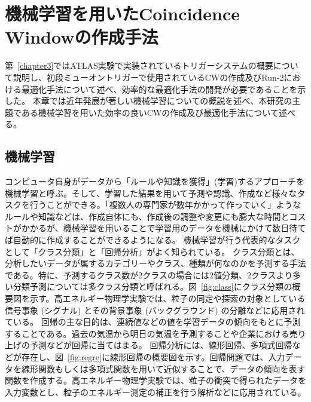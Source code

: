 \chapter{機械学習を用いたCoincidence Windowの作成手法}\label{chapter4}
第~\ref{chapter3}ではATLAS実験で実装されているトリガーシステムの概要について説明し、初段ミューオントリガーで使用されているCWの作成及びRun-2における最適化手法について述べ、効率的な最適化手法の開発が必要であることを示した。
本章では近年発展が著しい機械学習についての概説を述べ、本研究の主題である機械学習を用いた効率の良いCWの作成及び最適化手法について述べる。

\section{機械学習}\label{回帰分析}
コンピュータ自身がデータから「ルールや知識を獲得」(学習)するアプローチを機械学習と呼ぶ。そして、学習した結果を用いて予測や認識、作成など様々なタスクを行うことができる。「複数人の専門家が数年かかって作っていく」ようなルールや知識などは、作成自体にも、作成後の調整や変更にも膨大な時間とコストがかかるが、機械学習を用いることで学習用のデータを機械にかけて数日待てば自動的に作成することができるようになる。
機械学習が行う代表的なタスクとして「クラス分類」と「回帰分析」がよく知られている。
クラス分類とは、分析したいデータが属するカテゴリーやクラス、種類が何なのかを予測する手法である。特に、予測するクラス数が2クラスの場合には2値分類、2クラスより多い分類予測については多クラス分類と呼ばれる。図~\ref{fig:class}にクラス分類の概要図を示す。高エネルギー物理学実験では、粒子の同定や探索の対象としている信号事象 (シグナル) とその背景事象 (バックグラウンド) の分離などに応用されている。
回帰の主な目的は、連続値などの値を学習データの傾向をもとに予測することである。過去の気温から明日の気温を予測することや企業における売り上げの予測などが回帰に当てはまる。
回帰分析には、線形回帰、多項式回帰などが存在し、図~\ref{fig:regre}に線形回帰の概要図を示す。回帰問題では、入力データを線形関数もしくは多項式関数を用いて近似することで、データの傾向を表す関数を作成する。高エネルギー物理学実験では、粒子の衝突で得られたデータを入力変数とし、粒子のエネルギー測定の補正を行う解析などに応用されている。

